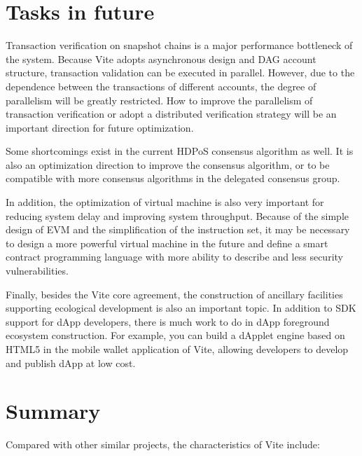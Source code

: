 \documentclass[UTF8,nofonts]{article}
\begin{document}
\begin{multicols}{2}
\section{Tasks in future}
Transaction verification on snapshot chains is a major performance bottleneck of the system. Because Vite adopts asynchronous design and DAG account structure, transaction validation can be executed in parallel. However, due to the dependence between the transactions of different accounts, the degree of parallelism will be greatly restricted. How to improve the parallelism of transaction verification or adopt a distributed verification strategy will be an important direction for future optimization.

Some shortcomings exist in the current HDPoS consensus algorithm as well. It is also an optimization direction to improve the consensus algorithm, or to be compatible with more consensus algorithms in the delegated consensus group.

In addition, the optimization of virtual machine is also very important for reducing system delay and improving system throughput. Because of the simple design of EVM and the simplification of the instruction set, it may be necessary to design a more powerful virtual machine in the future and define a smart contract programming language with more ability to describe and less security vulnerabilities.

Finally, besides the Vite core agreement, the construction of ancillary facilities supporting ecological development is also an important topic. In addition to SDK support for dApp developers, there is much work to do in dApp foreground ecosystem construction. For example, you can build a dApplet engine based on HTML5 in the mobile wallet application of Vite, allowing developers to develop and publish dApp at low cost.

\section{Summary}
Compared with other similar projects, the characteristics of Vite include:


\end{multicols}
\end{document}

